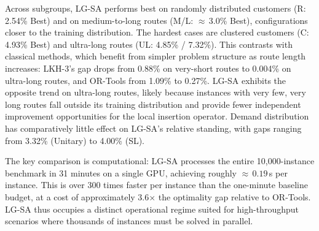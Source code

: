 \documentclass[letterpaper]{article} %
\begin{document}
Across subgroups, LG-SA performs best on randomly distributed customers (R: 2.54\% Best) and on medium-to-long routes (M/L: $\approx$\,3.0\% Best), configurations closer to the training distribution. The hardest cases are clustered customers (C: 4.93\% Best) and ultra-long routes (UL: 4.85\% / 7.32\%). This contrasts with classical methods, which benefit from simpler problem structure as route length increases: LKH-3's gap drops from 0.88\% on very-short routes to 0.004\% on ultra-long routes, and OR-Tools from 1.09\% to 0.27\%. LG-SA exhibits the opposite trend on ultra-long routes, likely because instances with very few, very long routes fall outside its training distribution and provide fewer independent improvement opportunities for the local insertion operator. Demand distribution has comparatively little effect on LG-SA's relative standing, with gaps ranging from 3.32\% (Unitary) to 4.00\% (SL).

The key comparison is computational: LG-SA processes the entire 10,000-instance benchmark in 31 minutes on a single GPU, achieving roughly $\approx$\,$0.19$\,s per instance. This is over 300 times faster per instance than the one-minute baseline budget, at a cost of approximately 3.6$\times$ the optimality gap relative to OR-Tools. LG-SA thus occupies a distinct operational regime suited for high-throughput scenarios where thousands of instances must be solved in parallel.
\end{document}
